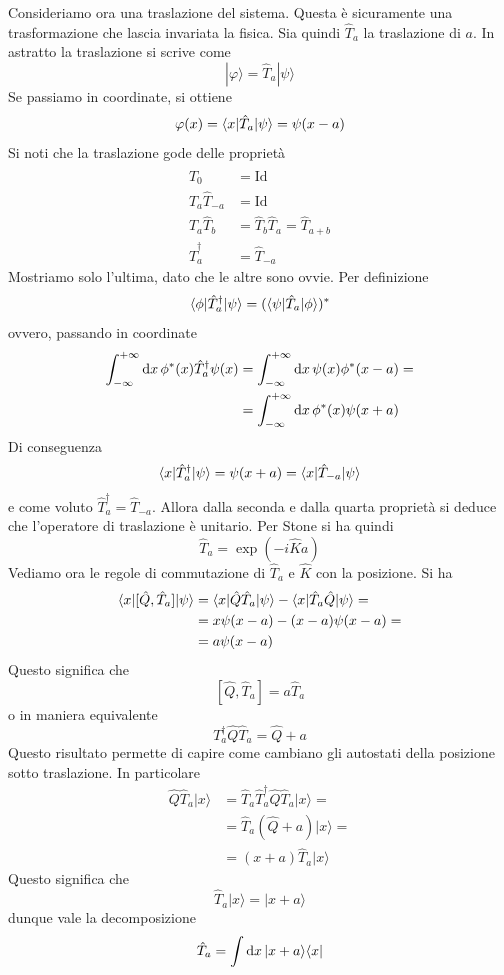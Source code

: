\documentclass[a4paper, 11pt]{article}
\newcommand{\id}{\mathrm{Id}}
\newcommand{\pos}{\hat{Q}}
\renewcommand{\ket}[1]{| #1\rangle}
\renewcommand{\bra}[1]{\langle #1|}
\begin{document}
Consideriamo ora una traslazione del sistema. Questa è sicuramente una trasformazione che lascia invariata la fisica. Sia quindi $\hat T_a$ la traslazione di $a$. In astratto la traslazione si scrive come
\[\ket{\varphi}=\hat T_a\ket\psi\]
Se passiamo in coordinate, si ottiene
\[\varphi(x)=\langle x|\hat T_a|\psi\rangle=\psi(x-a)\]
Si noti che la traslazione gode delle proprietà
\begin{align*}
	\hat T_0&=\id\\\hat T_a\hat T_{-a}&=\id\\\hat T_a\hat T_b&=\hat T_b\hat T_a=\hat T_{a+b}\\\hat T^\dagger_a&=\hat T_{-a}
\end{align*}
Mostriamo solo l'ultima, dato che le altre sono ovvie. Per definizione
\[\langle\phi|\hat T_a^\dagger|\psi\rangle=(\langle\psi|\hat T_a|\phi\rangle)^*\]
ovvero, passando in coordinate
\begin{align*}\int_{-\infty}^{+\infty}\mathrm{d} x\,\phi^*(x)\hat T_a^\dagger\psi(x)&=\int_{-\infty}^{+\infty}\mathrm{d} x\,\psi(x)\phi^*(x-a)=\\&=\int_{-\infty}^{+\infty}\mathrm{d} x\,\phi^*(x)\psi(x+a)\end{align*}
Di conseguenza
\[\langle x|\hat T_a^\dagger|\psi\rangle=\psi(x+a)=\langle x|\hat T_{-a}|\psi\rangle\]
e come voluto $\hat T^\dagger_a=\hat T_{-a}$. Allora dalla seconda e dalla quarta proprietà si deduce che l'operatore di traslazione è unitario. Per Stone si ha quindi
\[\hat T_a=\exp(-i\hat{K}a)\]
Vediamo ora le regole di commutazione di $\hat{T}_a$ e $\hat K$ con la posizione. Si ha
\begin{align*}
	\langle x|[\hat{Q},\hat{T}_a]|\psi\rangle&=\langle x|\hat{Q}\hat{T}_a|\psi\rangle-\langle x|\hat{T}_a\hat{Q}|\psi\rangle=\\&=x\psi(x-a)-(x-a)\psi(x-a)=\\&=a\psi(x-a)
\end{align*}
Questo significa che
\[[\pos,\hat{T}_a]=a\hat{T}_a\]
o in maniera equivalente
\[T^\dagger_a\pos\hat{T}_a=\hat{Q}+a\]
Questo risultato permette di capire come cambiano gli autostati della posizione sotto traslazione. In particolare
\begin{align*}
	\pos\hat{T}_a\ket{x}&=\hat{T}_a\hat{T}_a^\dagger\pos\hat{T}_a\ket{x}=\\&=\hat{T}_a(\pos+a)\ket{x}=\\&=(x+a)\hat{T}_a\ket
	x
\end{align*}
Questo significa che
\[\hat{T}_a\ket x=\ket{x+a}\]
dunque vale la decomposizione
\[\hat{T}_a=\int \d x\,\ket{x+a}\bra{x}\]
\end{document}

